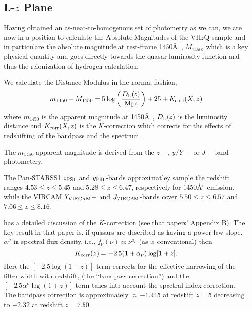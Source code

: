 \documentclass[usenatbib]{mnras}
\begin{document}
\subsection{L-$z$ Plane}
Having obtained an as-near-to-homogenous set of photometry as we can, 
we are now in a position to calculate the Absolute Magnitudes of the VH$z$Q 
sample and in particulare the absolute magnitude at rest-frame 1450\AA\ , $M_{1450}$, 
which is a key physical quantity and goes directly towards the quasar luminosity 
function and thus the reionization of hydrogen calculation. 

We calculate the Distance Modulus in the normal fashion, 
\begin{equation}
m_{1450} - M_{1450} = 5 \log \left (    \frac{ D_{\rm L}(z)}{\rm Mpc}  \right )  + 25 + K_{\rm corr}(X,z)
\end{equation}
where $m_{1450}$ is the apparent magnitude at 1450\AA\ ,  
$D_{\rm L}(z)$ is the luminosity distance and 
$K_{\rm corr}(X,z)$ is the $K$-correction which corrects for the effects of redshifting of the bandpass and the spectrum. 

The $m_{1450}$ apparent magnitude is derived from the $z-$, $y/Y-$ or $J-$band photometery.

The Pan-STARSS1 $z_{\rm PS1}$ and $y_{\rm PS1}$-bands approximatley
sample the redshift ranges $4.53\leq z \leq 5.45$ and $5.28\leq z \leq 6.47$, respectively 
for 1450\AA'\ emission, while the VIRCAM $Y_{\rm VIRCAM}-$ and $J_{\rm VIRCAM}$-bands 
cover $5.50\leq z \leq 6.57$ and $7.06\leq z \leq 8.16$. 

\citet{Ross2013} has a detailed discussion of the $K$-correction (see that papers' Appendix B). 
The key result in that paper is, if quasars are described as having a power-law slope, 
$\alpha^{\nu}$ in spectral flux density, i.e., $f_\nu(\nu) \propto \nu^{\alpha_{\nu}}$ (as is conventional) 
then 
\begin{equation}
K_{\rm corr}(z) = -2.5 (1 + \alpha_{\nu}) \log[1 + z].
\end{equation}
Here the $[-2.5 \log(1 + z)]$ term corrects for the effective narrowing of the filter width with redshift, (the ``bandpass correction'') and the $[-2.5 \alpha^{\nu} \log(1 + z)]$ term takes into account the spectral index correction. The bandpass correction is approximately $\approx -1.945$ at redshift $z=5$ decreasing to $-2.32$ at redshift $z=7.50$. 


\end{document}
